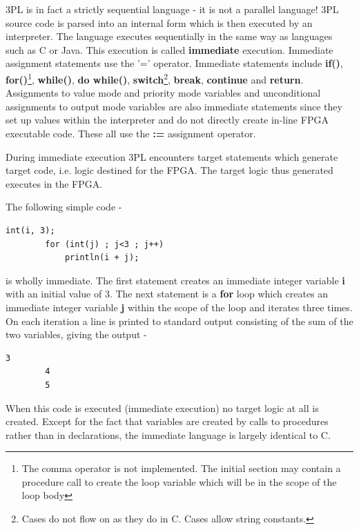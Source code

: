 \documentclass[10pt,a4paper,twoside,fleqn]{article}
\newcommand{\kwd}[1]{{\bf #1}} %
\newcommand{\var}[1]{{\bf #1}} %
\begin{document}
    3PL is in fact a strictly sequential language - it is not a parallel
    language! 3PL source code is parsed into an internal form which is then
    executed by an interpreter. The language executes sequentially in
    the same way as languages such as C or Java. This execution is called {\bf
    immediate} execution. Immediate assignment statements use the '=' operator.
    Immediate statements include {\bf if()}, {\bf for()}\footnote{The comma
    operator is not implemented. The initial section may contain a procedure
    call to create the loop variable which will be in the scope of the loop
    body}, {\bf while()}, {\bf do while()}, {\bf switch}\footnote{Cases do not
    flow on as they do in C. Cases allow string constants.}, {\bf break}, {\bf
    continue} and {\bf return}. Assignments to value mode and priority mode
    variables and unconditional assignments to output mode variables are also
    immediate statements since they set up values within the interpreter and do
    not directly create in-line FPGA executable code. These all use the {\bf :=}
    assignment operator.
    
    During immediate execution 3PL encounters target statements which generate
    target code, i.e. logic destined for the FPGA. The target logic thus generated
    executes in the FPGA.
    
    The following simple code -
    \begin{lstlisting}[language=threepl]
        int(i, 3);
        for (int(j) ; j<3 ; j++)
            println(i + j);
    \end{lstlisting}
    is wholly immediate. The first statement creates an immediate integer
    variable \var{i} with an initial value of 3. The next statement is a \kwd{for}
    loop which creates an immediate integer variable \var{j} within the scope
    of the loop and iterates three times. On each iteration a line is printed
    to standard output consisting of the sum of the two variables, giving the
    output -
    \begin{lstlisting}[language=threepl]
        3
        4
        5
    \end{lstlisting}
    When this code is executed (immediate execution) no target logic at all
    is created. Except for the fact that variables are created by calls to
    procedures rather than in declarations, the immediate language is largely
    identical to C.
\end{document}
